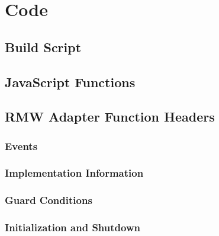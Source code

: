 \chapter{Code}

\section{Build Script}\label{sec:apxblasm}

    

\section{JavaScript Functions}\label{sec:apxmodule}

    

\section{RMW Adapter Function Headers}\label{sec:apxrmw}

    \subsection{Events}

        

    \subsection{Implementation Information}
        

        

        

        

        

    \subsection{Guard Conditions}

        

    \subsection{Initialization and Shutdown}

